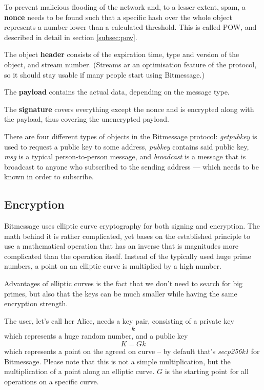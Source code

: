 \documentclass{bfh}
\begin{document}
  To prevent malicious flooding of the network and, to a lesser extent, spam, a \textbf{nonce} needs to be found such that a specific hash over the whole object represents a number lower than a calculated threshold. This is called \acf{POW}, and described in detail in section \ref{subsec:pow}.

  The object \textbf{header} consists of the expiration time, type and version of the object, and stream number. (Streams ar an optimisation feature of the protocol, so it should stay usable if many people start using Bitmessage.)
  
  The \textbf{payload} contains the actual data, depending on the message type.
  
  The \textbf{signature} covers everything except the nonce and is encrypted along with the payload, thus covering the unencrypted payload.

  There are four different types of objects in the Bitmessage protocol: \textit{getpubkey} is used to request a public key to some address, \textit{pubkey} contains said public key, \textit{msg} is a typical person-to-person message, and \textit{broadcast} is a message that is broadcast to anyone who subscribed to the sending address --- which needs to be known in order to subscribe.


  \subsection{Encryption}
  \label{subsec:encryption}
  Bitmessage uses elliptic curve cryptography for both signing and encryption. The math behind it is rather complicated, yet bases on the established principle to use a mathematical operation that has an inverse that is magnitudes more complicated than the operation itself. Instead of the typically used huge prime numbers, a point on an elliptic curve is multiplied by a high number.

  Advantages of elliptic curves is the fact that we don't need to search for big primes, but also that the keys can be much smaller while having the same encryption strength.

  The user, let's call her Alice, needs a key pair, consisting of a private key
$$k$$
which represents a huge random number, and a public key
$$K = G k$$
which represents a point on the agreed on curve -- by default that's \textit{secp256k1} for Bitmessage. Please note that this is not a simple multiplication, but the multiplication of a point along an elliptic curve. $G$ is the starting point for all operations on a specific curve.
\end{document}

